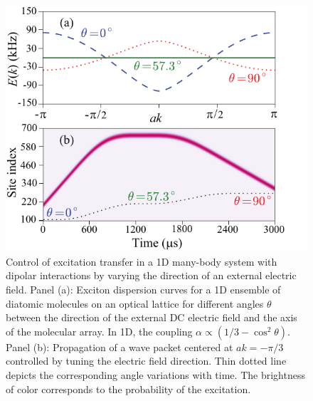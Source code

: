 \begin{figure}[htbp]
\centering
\includegraphics[width=\linewidth]{control-exciton.pdf}
\caption{ Control of excitation transfer in a 1D many-body system with dipolar interactions by varying the 
direction of an external electric field.
Panel (a): Exciton dispersion curves for a 1D
ensemble  of diatomic molecules on an optical lattice for
different angles $\theta$ between the direction of the external DC
electric field and the axis of the molecular array.  In 1D, the coupling $\alpha\propto (1/3 - \cos^2\theta)$.  Panel (b):
Propagation of a wave packet centered at $ak =-\pi/3$ controlled
by tuning the electric field direction. Thin dotted line depicts
the corresponding angle variations with time. The brightness
of color corresponds to the probability of the excitation. }
\label{control-exciton}
\end{figure}

